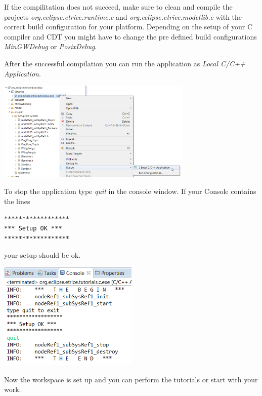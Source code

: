 If the compilitation does not succeed, make sure to clean and compile the projects \emph{org.eclipse.etrice.runtime.c} and \emph{org.eclipse.etrice.modellib.c} with the correct build configuration for your platform. Depending on the setup of your C compiler and CDT you might have to change the pre defined build configurations \emph{MinGWDebug} or \emph{PosixDebug}.

After the successful compilation you can run the application as \emph{Local C/C++ Application}.

\includegraphics[width=0.7\textwidth]{images/014-08-RunAsC-CPP-Application.png}

To stop the application type \emph{quit} in the console window. If your Console contains the lines
\begin{verbatim}
******************
*** Setup OK ***
******************
\end{verbatim}
your setup should be ok.

\includegraphics[width=0.5\textwidth]{images/014-09-ConsoleWithSetupOk.png} 

Now the workspace is set up and you can perform the tutorials or start with your work.

